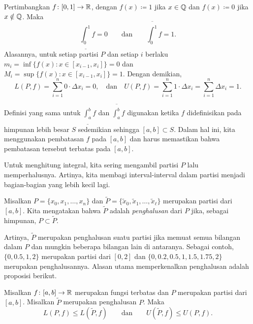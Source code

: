 \begin{example} \label{example:dirichletfunc}
Pertimbangkan 
$f \colon [0,1] \to {\mathbb{R}}$, dengan $f(x) \coloneqq 1$ jika
$x \in {\mathbb{Q}}$ dan $f(x) \coloneqq 0$ jika $x \notin {\mathbb{Q}}$.  Maka
\begin{equation*}
\underline{\int_0^1} f = 0 \qquad \text{dan} \qquad
\overline{\int_0^1} f = 1 .
\end{equation*}
Alasannya, untuk setiap partisi $P$ dan setiap $i$ berlaku 
$m_i = \inf \bigl\{ f(x) : x \in [x_{i-1},x_i] \bigr\} = 0$  dan
$M_i = \sup \bigl\{ f(x) : x \in [x_{i-1},x_i] \bigr\} = 1$.  Dengan demikian,
\begin{equation*}
L(P,f) = \sum_{i=1}^n 0 \cdot \Delta x_i = 0 , \quad \text{dan} \quad
U(P,f) = \sum_{i=1}^n 1 \cdot \Delta x_i = \sum_{i=1}^n \Delta x_i = 1  .
\end{equation*}
\end{example}

\begin{remark}
Definisi yang sama untuk $\underline{\int_a^b} f$ dan
$\overline{\int_a^b} f$
digunakan ketika $f$ didefinisikan pada himpunan lebih besar $S$ sedemikian sehingga
$[a,b] \subset S$.  Dalam hal ini, kita menggunakan pembatasan $f$ pada $[a,b]$
dan harus memastikan bahwa pembatasan tersebut terbatas pada $[a,b]$.
\end{remark}

Untuk menghitung integral, kita sering mengambil partisi $P$ lalu memperhalusnya.
Artinya, kita membagi interval-interval dalam partisi menjadi bagian-bagian yang lebih kecil lagi.

\begin{defn}
Misalkan $P = \{ x_0, x_1, \ldots, x_n \}$ dan
$\widetilde{P} = \{ \widetilde{x}_0, \widetilde{x}_1, \ldots,
\widetilde{x}_{\ell} \}$ merupakan
partisi dari $[a,b]$.  Kita mengatakan bahwa $\widetilde{P}$ adalah
\emph{penghalusan} dari $P$
jika, sebagai himpunan, $P \subset \widetilde{P}$.
\end{defn}

Artinya, $\widetilde{P}$ merupakan penghalusan suatu partisi jika memuat semua
bilangan dalam $P$ dan mungkin beberapa bilangan lain di antaranya.  Sebagai contoh,
$\{ 0, 0.5, 1, 2 \}$ merupakan partisi dari $[0,2]$ dan
$\{ 0, 0.2, 0.5, 1, 1.5, 1.75, 2 \}$ merupakan penghalusannya.
Alasan utama memperkenalkan penghalusan adalah proposisi berikut.

\begin{prop} \label{prop:refinement}
Misalkan $f \colon [a,b] \to {\mathbb{R}}$ merupakan fungsi terbatas dan $P$
merupakan partisi dari $[a,b]$.  Misalkan $\widetilde{P}$ merupakan penghalusan $P$.
Maka
\begin{equation*}
L(P,f) \leq L(\widetilde{P},f) 
\qquad \text{dan} \qquad
U(\widetilde{P},f) \leq U(P,f) .
\end{equation*}
\end{prop}

